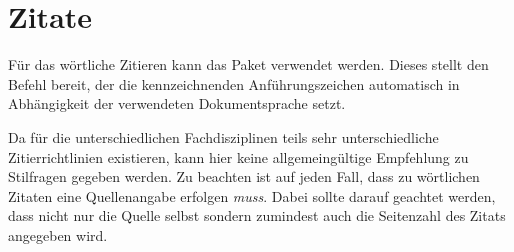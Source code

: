 \documentclass[%
  english,ngerman,%
  cdgeometry=no,DIV=12,automark,%
]{tudscrartcl}
\begin{document}
\section{Zitate}
Für das wörtliche Zitieren kann das Paket  verwendet werden. 
Dieses stellt den Befehl  bereit, der die kennzeichnenden 
Anführungszeichen automatisch in Abhängigkeit der verwendeten Dokumentsprache 
setzt. 
%
\begin{Hint}
\usepackage{csquotes}
\end{Hint}
%
Da für die unterschiedlichen Fachdisziplinen teils sehr unterschiedliche 
Zitierrichtlinien existieren, kann hier keine allgemeingültige Empfehlung zu 
Stilfragen gegeben werden. Zu beachten ist auf jeden Fall, dass zu wörtlichen 
Zitaten eine Quellenangabe erfolgen \emph{muss}. Dabei sollte darauf geachtet 
werden, dass nicht nur die Quelle selbst sondern zumindest auch die Seitenzahl 
des Zitats angegeben wird.
%
\end{document}
